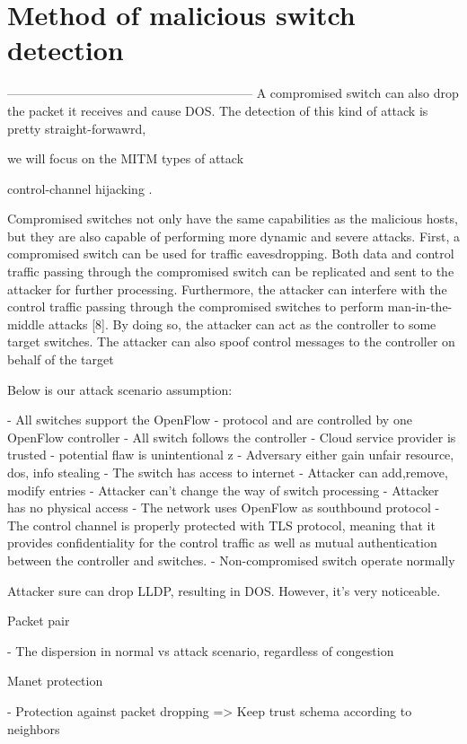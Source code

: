 \chapter{Method of malicious switch detection}

-----------------------------------------------------------
A compromised switch can also drop the packet it receives and cause DOS. The detection of this kind of attack is pretty straight-forwawrd, 

we will focus on the MITM types of attack


control-channel hijacking \cite{SIYN}. 


Compromised switches not only have the same capabilities as the malicious hosts, but they are also capable of performing more dynamic and severe attacks.
First, a compromised switch can be used for traffic eavesdropping. Both data and control traffic passing through the compromised switch can be replicated and sent to the attacker for further processing. Furthermore, the
attacker can interfere with the control traffic passing through the compromised
switches to perform man-in-the-middle attacks [8]. By doing so, the
attacker can act as the controller to some target switches. The attacker can
also spoof control messages to the controller on behalf of the target

Below is our attack scenario assumption: 

- All switches support the OpenFlow
- protocol and are controlled by one OpenFlow controller
- All switch follows the controller
- Cloud service provider is trusted
- potential flaw is unintentional z
- Adversary either gain unfair resource, dos, info stealing
- The switch has access to internet
- Attacker can add,remove, modify entries
- Attacker can’t change the way of switch processing
- Attacker has no physical access
- The network uses OpenFlow as southbound protocol
- The control channel is properly protected with TLS protocol, meaning
that it provides confidentiality for the control traffic as well as mutual
authentication between the controller and switches.
- Non-compromised switch operate normally

Attacker sure can drop LLDP, resulting in DOS. However, it’s very noticeable.

Packet pair

- The dispersion in normal vs attack scenario, regardless of congestion


Manet protection

- Protection against packet dropping => Keep trust schema according to neighbors

